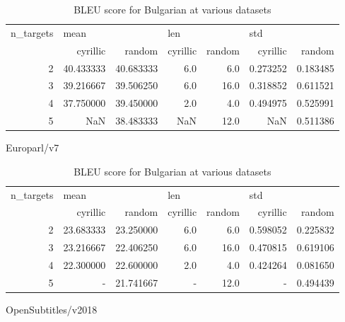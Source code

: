 \begin{table}[h]
\begin{subtable}[t]{1\linewidth}
\begin{tabular}{rrrrrrr}
\toprule
n\_targets & \multicolumn{2}{l}{mean} & \multicolumn{2}{l}{len} & \multicolumn{2}{l}{std} \\
          &   cyrillic &     random & cyrillic & random &  cyrillic &    random \\
\midrule
        2 &  40.433333 &  40.683333 &      6.0 &    6.0 &  0.273252 &  0.183485 \\
        3 &  39.216667 &  39.506250 &      6.0 &   16.0 &  0.318852 &  0.611521 \\
        4 &  37.750000 &  39.450000 &      2.0 &    4.0 &  0.494975 &  0.525991 \\
        5 &        NaN &  38.483333 &      NaN &   12.0 &       NaN &  0.511386 \\
\bottomrule
\end{tabular}
\caption{Europarl/v7}
\label{ table:bg/Europarl/v7 }
\end{subtable}
\begin{subtable}[t]{1\linewidth}
\begin{tabular}{rrrrrrr}
\toprule
n\_targets & \multicolumn{2}{l}{mean} & \multicolumn{2}{l}{len} & \multicolumn{2}{l}{std} \\
          &   cyrillic &     random & cyrillic & random &  cyrillic &    random \\
\midrule
        2 &  23.683333 &  23.250000 &      6.0 &    6.0 &  0.598052 &  0.225832 \\
        3 &  23.216667 &  22.406250 &      6.0 &   16.0 &  0.470815 &  0.619106 \\
        4 &  22.300000 &  22.600000 &      2.0 &    4.0 &  0.424264 &  0.081650 \\
        5 &          - &  21.741667 &        - &   12.0 &         - &  0.494439 \\
\bottomrule
\end{tabular}
\caption{OpenSubtitles/v2018}
\label{tab:bg/OpenSubtitles/v2018}
\end{subtable}
\caption{BLEU score for Bulgarian at various datasets }
\end{table}

